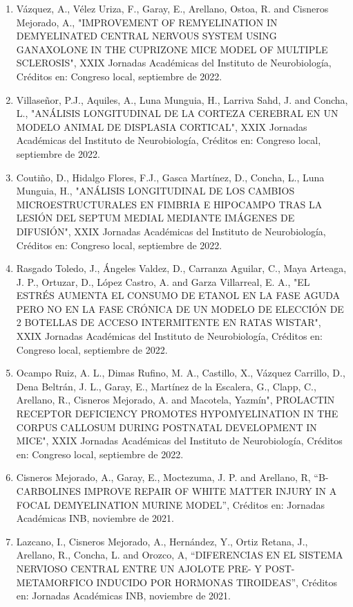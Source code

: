 \documentclass[12pt]{article}
\begin{document}
\begin{enumerate}
\item Vázquez, A., Vélez Uriza, F., Garay, E., Arellano, Ostoa, R. and Cisneros Mejorado, A., "IMPROVEMENT OF REMYELINATION IN 
DEMYELINATED CENTRAL NERVOUS SYSTEM USING GANAXOLONE IN THE CUPRIZONE MICE MODEL OF MULTIPLE SCLEROSIS", XXIX Jornadas Académicas del 
Instituto de Neurobiología, Créditos en: Congreso local, septiembre de 2022.

\item Villaseñor, P.J., Aquiles, A., Luna Munguia, H., Larriva Sahd, J. and Concha, L., "ANÁLISIS LONGITUDINAL DE LA CORTEZA CEREBRAL 
EN 
UN MODELO ANIMAL DE DISPLASIA CORTICAL", XXIX Jornadas Académicas del Instituto de Neurobiología, Créditos en: Congreso local, 
septiembre de 2022.

\item Coutiño, D., Hidalgo Flores, F.J., Gasca Martínez, D., Concha, L., Luna Munguia, H., "ANÁLISIS LONGITUDINAL DE LOS CAMBIOS 
MICROESTRUCTURALES EN FIMBRIA E HIPOCAMPO TRAS LA LESIÓN DEL SEPTUM MEDIAL MEDIANTE IMÁGENES DE DIFUSIÓN", XXIX Jornadas Académicas del 
Instituto de Neurobiología, Créditos en: Congreso local, septiembre de 2022.

\item Rasgado Toledo, J., Ángeles Valdez, D., Carranza Aguilar, C., Maya Arteaga, J. P., Ortuzar, D., López Castro, A. and Garza 
Villarreal, E. A., "EL ESTRÉS AUMENTA EL CONSUMO DE ETANOL EN LA FASE AGUDA PERO NO EN LA FASE CRÓNICA DE UN MODELO DE ELECCIÓN DE 2 
BOTELLAS DE ACCESO INTERMITENTE EN RATAS WISTAR", XXIX Jornadas Académicas del Instituto de Neurobiología, Créditos en: Congreso local, 
septiembre de 2022.

\item Ocampo Ruiz, A. L., Dimas Rufino, M. A., Castillo, X., Vázquez Carrillo, D., Dena Beltrán, J. L., Garay, E., Martínez de la 
Escalera, G., Clapp, C., Arellano, R., Cisneros Mejorado, A. and Macotela, Yazmín", PROLACTIN RECEPTOR DEFICIENCY PROMOTES 
HYPOMYELINATION IN THE CORPUS CALLOSUM DURING POSTNATAL DEVELOPMENT IN MICE", XXIX Jornadas Académicas del Instituto de Neurobiología, 
Créditos en: Congreso local, septiembre de 2022.

\item Cisneros Mejorado, A., Garay, E., Moctezuma, J. P. and Arellano, R, “B-CARBOLINES IMPROVE REPAIR OF WHITE MATTER INJURY IN A 
FOCAL 
DEMYELINATION MURINE MODEL”, Créditos en: Jornadas Académicas INB, noviembre de 2021.

\item Lazcano, I., Cisneros Mejorado, A., Hernández, Y., Ortiz Retana, J., Arellano, R., Concha, L. and Orozco, A, “DIFERENCIAS EN EL 
SISTEMA NERVIOSO CENTRAL ENTRE UN AJOLOTE PRE- Y POST- METAMORFICO INDUCIDO POR 
HORMONAS TIROIDEAS”, Créditos en: Jornadas Académicas INB, noviembre de 2021.


\end{enumerate}
\end{document}
